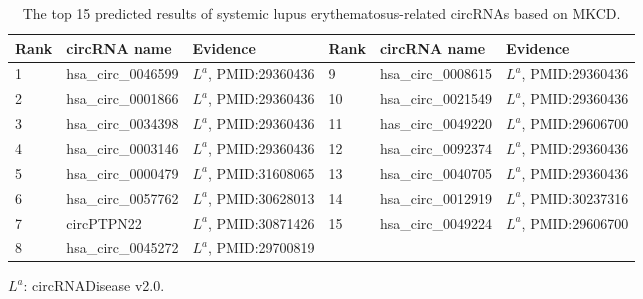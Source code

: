 \documentclass{bioinfo}
\begin{document}
\begin{methods}
\begin{table}[!t]
	\label{tab:04}
    \centering
    \begin{threeparttable}[b]  
        \caption{The top 15 predicted results of systemic lupus erythematosus-related circRNAs based on MKCD.}	\label{tab:tab4}
        \vspace{0.4cm}
        \setlength{\tabcolsep}{0pt}  %
        \begin{tabular}{p{2cm}<{\centering} p{3.9cm}<{\raggedright} p{4.5cm}<{\raggedright} | p{2cm}<{\centering} p{3.9cm}<{\raggedright} p{4.2cm}<{\raggedright}}
            \hline
            \textbf{Rank} &  \textbf{circRNA name} & \textbf{Evidence} & \textbf{Rank} &  \textbf{circRNA name} & \textbf{Evidence} \\
            \hline
            1 & hsa\_circ\_0046599 & $L^a$, PMID:29360436 & 9 & hsa\_circ\_0008615 & $L^a$, PMID:29360436 \\
            2 & hsa\_circ\_0001866 & $L^a$, PMID:29360436 & 10 & hsa\_circ\_0021549 & $L^a$, PMID:29360436 \\
            3 & hsa\_circ\_0034398 & $L^a$, PMID:29360436 & 11 & has\_circ\_0049220 & $L^a$, PMID:29606700 \\
            4 & hsa\_circ\_0003146 & $L^a$, PMID:29360436 & 12 & hsa\_circ\_0092374 & $L^a$, PMID:29360436 \\
            5 & hsa\_circ\_0000479 & $L^a$, PMID:31608065 & 13 & hsa\_circ\_0040705 & $L^a$, PMID:29360436 \\
            6 & hsa\_circ\_0057762 & $L^a$, PMID:30628013 & 14 & hsa\_circ\_0012919 & $L^a$, PMID:30237316 \\
            7 & circPTPN22 & $L^a$, PMID:30871426 & 15 & hsa\_circ\_0049224 & $L^a$, PMID:29606700 \\
            8 & hsa\_circ\_0045272 & $L^a$, PMID:29700819 & & & \\
            \hline
        \end{tabular}
        \begin{tablenotes}
            \item $L^a$: circRNADisease v2.0.
        \end{tablenotes}
    \end{threeparttable}
    \vspace{-0.4cm}
\end{table}


\end{methods}
\end{document}
